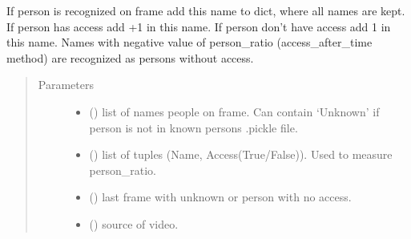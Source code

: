 \documentclass[letterpaper,10pt,english]{sphinxmanual}
\begin{document}
\begin{fulllineitems}
\begin{fulllineitems}
\label{\detokenize{doc/Access/AccesAfterTime:AccesAfterTime.AccessAfterTime.get_persons_from_frame}}
If person is recognized on frame add this name to dict, where all names are kept. If person has
access add +1 in this name. If person don’t have access add \sphinxhyphen{}1 in this name. Names with negative value
of person\_ratio (access\_after\_time method) are recognized as persons without access.
\begin{quote}\begin{description}
\item[{Parameters}] \leavevmode\begin{itemize}
\item {} 
 () \textendash{} list of names people on frame. Can contain ‘Unknown’ if person is not in known persons .pickle file.

\item {} 
 () \textendash{} list of tuples (Name, Access(True/False)). Used to measure person\_ratio.

\item {} 
 () \textendash{} last frame with unknown or person with no access.

\item {} 
 ({\hyperref[\detokenize{doc/VideoStream/WebCamStream:WebCamStream.WebCamStream}]{}}) \textendash{} source of video.

\end{itemize}

\end{description}\end{quote}

\end{fulllineitems}



\end{fulllineitems}
\end{document}
